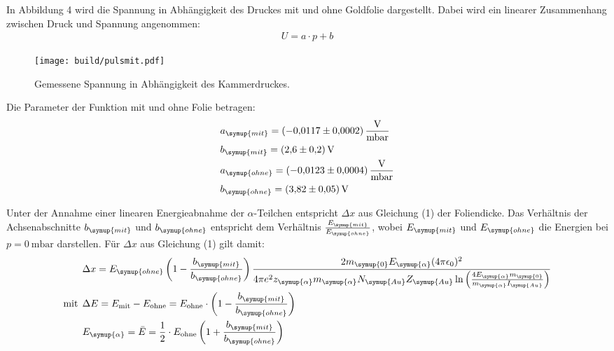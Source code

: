 In Abbildung 4 wird  die Spannung in Abhängigkeit des Druckes mit und ohne Goldfolie dargestellt. Dabei wird ein linearer
Zusammenhang zwischen Druck und Spannung angenommen:
\begin{align*}
  U = a \cdot p + b
\end{align*}

\begin{figure}[H]
  \centering
  \texttt{[image: build/pulsmit.pdf]}
  \caption{Gemessene Spannung in Abhängigkeit des Kammerdruckes.}
  \label{fig:ohn}
\end{figure}

Die Parameter der Funktion mit und ohne Folie betragen:
\begin{align*}
  &a_{\symup{mit}} = \SI{-0.0117(2)}{\volt\per\milli\bar}  \\
  &b_{\symup{mit}} = \SI{2.6(2)}{\volt}  \\
  &a_{\symup{ohne}}= \SI{-0.0123(4)}{\volt\per\milli\bar}  \\
  &b_{\symup{ohne}} = \SI{ 3.82(5)}{\volt} \\
\end{align*}

Unter der Annahme einer linearen Energieabnahme der $\alpha$-Teilchen entspricht $\Delta x$ aus Gleichung (1) der Foliendicke.
Das Verhältnis der Achsenabschnitte $b_{\symup{mit}}$ und $b_{\symup{ohne}}$ entspricht dem Verhältnis $\frac{E_{\symup{mit}}}{E_{\symup{ohne}}}$, wobei
$E_{\symup{mit}}$ und $E_{\symup{ohne}}$ die Energien bei $p=\SI{0}{\milli\bar}$ darstellen.
Für $\Delta x$ aus Gleichung (1) gilt damit:
\begin{align}
  &\Delta x = E_{\symup{ohne}} \left(1- \frac{b_{\symup{mit}}}{b_{\symup{ohne}}}\right) \frac{2 m_{\symup{0}} E_{\symup{\alpha}} (4 \pi \epsilon_0)^2}{4 \pi e^2 z_{\symup{\alpha}}  m_{\symup{\alpha}} N_{\symup{Au}} Z_{\symup{Au}} \ln{\left(\frac{4 E_{\symup{\alpha}} m_{\symup{0}}}{m_{\symup{\alpha}} I_{\symup{Au}}}\right)}} \\
  \text{mit} \:\: &\Delta E = E_{\mathrm{mit}} - E_{\mathrm{ohne}} = E_{\mathrm{ohne}} \cdot \left(1- \frac{b_{\symup{mit}}}{b_{\symup{ohne}}}\right) \\
  &E_{\symup{\alpha}} = \bar{E} = \frac{1}{2} \cdot E_{\mathrm{ohne}} \left(1+ \frac{b_{\symup{mit}}}{b_{\symup{ohne}}}\right)
\end{align}

